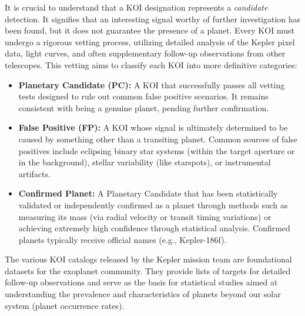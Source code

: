 It is crucial to understand that a KOI designation represents a \textit{candidate} detection. It signifies that an interesting signal worthy of further investigation has been found, but it does not guarantee the presence of a planet. Every KOI must undergo a rigorous vetting process, utilizing detailed analysis of the Kepler pixel data, light curves, and often supplementary follow-up observations from other telescopes. This vetting aims to classify each KOI into more definitive categories:

\begin{itemize}
    \item \textbf{Planetary Candidate (PC):} A KOI that successfully passes all vetting tests designed to rule out common false positive scenarios. It remains consistent with being a genuine planet, pending further confirmation.
    \item \textbf{False Positive (FP):} A KOI whose signal is ultimately determined to be caused by something other than a transiting planet. Common sources of false positives include eclipsing binary star systems (within the target aperture or in the background), stellar variability (like starspots), or instrumental artifacts.
    \item \textbf{Confirmed Planet:} A Planetary Candidate that has been statistically validated or independently confirmed as a planet through methods such as measuring its mass (via radial velocity or transit timing variations) or achieving extremely high confidence through statistical analysis. Confirmed planets typically receive official names (e.g., Kepler-186f).
\end{itemize}

The various KOI catalogs released by the Kepler mission team are foundational datasets for the exoplanet community. They provide lists of targets for detailed follow-up observations and serve as the basis for statistical studies aimed at understanding the prevalence and characteristics of planets beyond our solar system (planet occurrence rates).

